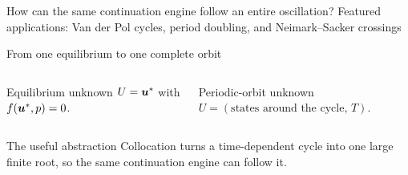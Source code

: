   {How can the same continuation engine follow an entire oscillation?}
  {Featured applications: Van der Pol cycles, period doubling, and Neimark--Sacker crossings}

\begin{frame}{From one equilibrium to one complete orbit}
\releasedbadge
\small
\begin{columns}[T]
\centering
{}
\begin{block}{Equilibrium unknown}
$U=\bm{u}^*$ with $f(\bm{u}^*,p)=0$.
\end{block}
\centering
{}
\begin{block}{Periodic-orbit unknown}
$U=(\text{states around the cycle},\,T)$.
\end{block}
\end{columns}
\begin{alertblock}{The useful abstraction}
Collocation turns a time-dependent cycle into one large finite root, so the
same continuation engine can follow it.
\end{alertblock}
\end{frame}

